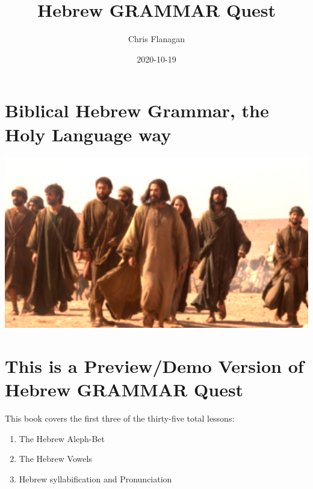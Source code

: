 \documentclass[
]{turabian-researchpaper}
\title{Hebrew GRAMMAR Quest}
\author{Chris Flanagan}
\date{2020-10-19}
\providecommand{\tightlist}{%
  \setlength{\itemsep}{0pt}\setlength{\parskip}{0pt}}
\begin{document}
\maketitle

{
\hypersetup{linkcolor=}
\setcounter{tocdepth}{2}
\tableofcontents
}
\listoftables
\listoffigures
\hypertarget{biblical-hebrew-grammar-the-holy-language-way}{%
\section*{Biblical Hebrew Grammar, the Holy Language way}\label{biblical-hebrew-grammar-the-holy-language-way}}

\begin{center}\includegraphics[width=500pt]{images/hli_cover} \end{center}

\hypertarget{this-is-a-previewdemo-version-of-hebrew-grammar-quest}{%
\section*{This is a Preview/Demo Version of Hebrew GRAMMAR Quest}\label{this-is-a-previewdemo-version-of-hebrew-grammar-quest}}

This book covers the first three of the thirty-five total lessons:

\begin{enumerate}
\def\labelenumi{\arabic{enumi}.}
\tightlist
\item
  The Hebrew Aleph-Bet
\item
  The Hebrew Vowels
\item
  Hebrew syllabification and Pronunciation
\end{enumerate}
\end{document}
